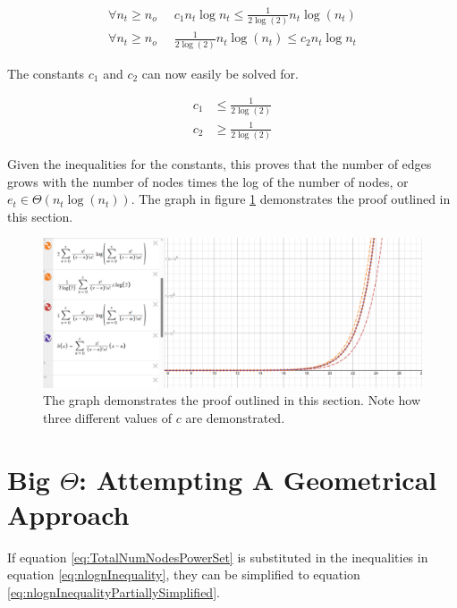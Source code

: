 \documentclass{article}
\begin{document}
\begin{equation}
    \begin{split}
        \forall n_t\ge n_o \;\; &
        c_1 n_t \log n_t \le \frac{1}{2\log(2)}n_t\log(n_t)
        \\
        \forall n_t\ge n_o \;\; &
        \frac{1}{2\log(2)}n_t\log(n_t) \le c_2 n_t \log n_t
    \end{split}
    \label{eq:nlognInequalitySimplified}
\end{equation}

The constants $c_1$ and $c_2$ can now easily be solved for.

\begin{equation}
    \begin{split}
        c_1 &\le \frac{1}{2\log(2)}
        \\
        c_2 &\ge \frac{1}{2\log(2)}
    \end{split}
    \label{eq:BoundaryInequalities}
\end{equation}

Given the inequalities for the constants, this proves that the number of edges grows with the number of nodes times the log of the number of nodes, or $e_t\in \Theta(n_t\log(n_t))$. The graph in figure \ref{fig:DesmosProof} demonstrates the proof outlined in this section.

\begin{figure}[h]
    \center
    \includegraphics[scale=0.4]{img/DesmosProof.png}
    \caption{The graph demonstrates the proof outlined in this section. Note how three different values of $c$ are demonstrated.}
    \label{fig:DesmosProof}
\end{figure}

\section{Big $\Theta$: Attempting A Geometrical Approach}
\label{sec:TigherBoundGeometricalApproach}

If equation \ref{eq:TotalNumNodesPowerSet} is substituted in the inequalities in equation \ref{eq:nlognInequality}, they can be simplified to equation \ref{eq:nlognInequalityPartiallySimplified}.
\end{document}
